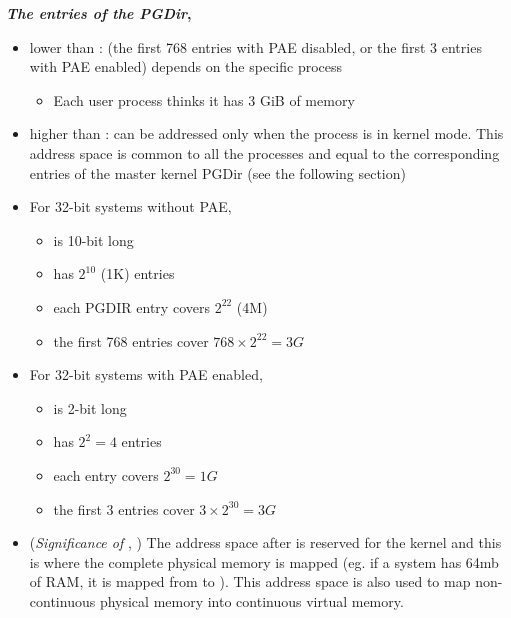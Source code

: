 \textbf{\emph{The entries of the PGDir}, \cite[Sec 2.5.4]{bovet2005understanding}}
\begin{itemize}
\item lower than : (the first 768 entries with PAE disabled, or the first 3
  entries with PAE enabled) depends on the specific process
  \begin{itemize}
  \item Each user process thinks it has 3 GiB of memory
  \end{itemize}
\item higher than : can be addressed only when the process is in kernel
  mode. This address space is common to all the processes and equal to the corresponding
  entries of the master kernel PGDir (see the following section)
\item For 32-bit systems without PAE, 
\begin{itemize}
\item is 10-bit long 
\item has $2^{10}$ (1K) entries
\item each PGDIR entry covers $2^{22}$ (4M)
\item the first 768 entries cover $768\times{}2^{22}=3G$
\end{itemize}
\item For 32-bit systems with PAE enabled, 
\begin{itemize}
\item is 2-bit long
\item has $2^2=4$ entries
\item each  entry covers $2^{30} = 1G$
\item the first 3 entries cover $3\times{}2^{30}=3G$
\end{itemize}
\item (\emph{Significance of }, \cite[Sec 1.3.1]{abhishek2002memory})
  The address space after  is reserved for the kernel and this is where
  the complete physical memory is mapped (eg. if a system has 64mb of RAM, it is mapped
  from  to ). This address space is also used
  to map non-continuous physical memory into continuous virtual memory.
\end{itemize}

